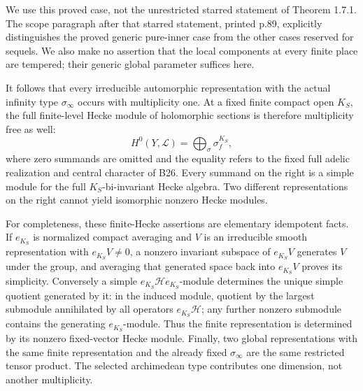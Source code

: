 We use this proved case, not the unrestricted starred statement
of Theorem 1.7.1.  The scope paragraph after that starred
statement, printed p.89, explicitly distinguishes the proved
generic pure-inner case from the other cases reserved for
sequels.  We also make no assertion that the local components
at every finite place are tempered; their generic global
parameter suffices here.

It follows that every irreducible automorphic representation
with the actual infinity type $\sigma_\infty$ occurs with
multiplicity one.  At a fixed finite compact open $K_S$, the
full finite-level Hecke module of holomorphic sections is
therefore multiplicity free as well:
\[
          H^0(Y,\mathscr L)
              =\bigoplus_{\sigma}
                    \sigma_f^{K_S},
 \tag{B27e}
\]
where zero summands are omitted and the equality refers to the
fixed full adelic realization and central character of B26.
Every summand on the right is a simple module for the full
$K_S$-bi-invariant Hecke algebra.  Two different representations
on the right cannot yield isomorphic nonzero Hecke modules.

For completeness, these finite-Hecke assertions are elementary
idempotent facts.  If $e_{K_S}$ is normalized compact averaging
and $V$ is an irreducible smooth representation with
$e_{K_S}V\ne0$, a nonzero invariant subspace of $e_{K_S}V$
generates $V$ under the group, and averaging that generated
space back into $e_{K_S}V$ proves its simplicity.  Conversely
a simple $e_{K_S}\mathcal H e_{K_S}$-module determines the unique
simple quotient generated by it: in the induced module, quotient
by the largest submodule annihilated by all operators
$e_{K_S}\mathcal H$; any further nonzero submodule contains the
generating $e_{K_S}$-module.  Thus the finite representation is
determined by its nonzero fixed-vector Hecke module.  Finally,
two global representations with the same finite representation
and the already fixed $\sigma_\infty$ are the same restricted
tensor product.  The selected archimedean type contributes
one dimension, not another multiplicity.

